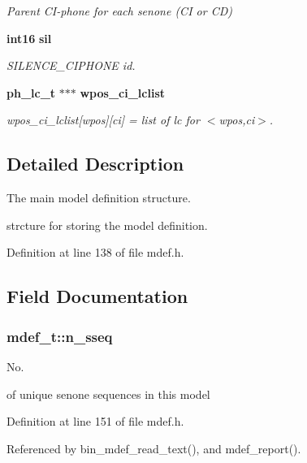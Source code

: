 \begin{DoxyCompactItemize}
\begin{DoxyCompactList}\small\item\em \-Parent \-C\-I-\/phone for each senone (\-C\-I or \-C\-D) \end{DoxyCompactList}\item 
{\bf int16} {\bf sil}\label{structmdef__t_acc9a57b57bbecaef55cc72be57b875f6}

\begin{DoxyCompactList}\small\item\em \-S\-I\-L\-E\-N\-C\-E\-\_\-\-C\-I\-P\-H\-O\-N\-E id. \end{DoxyCompactList}\item 
{\bf ph\-\_\-lc\-\_\-t} $\ast$$\ast$$\ast$ {\bf wpos\-\_\-ci\-\_\-lclist}
\begin{DoxyCompactList}\small\item\em wpos\-\_\-ci\-\_\-lclist[wpos][ci] = list of lc for $<$wpos,ci$>$. \end{DoxyCompactList}\end{DoxyCompactItemize}


\subsection{\-Detailed \-Description}
\-The main model definition structure. 

strcture for storing the model definition. 

\-Definition at line 138 of file mdef.\-h.



\subsection{\-Field \-Documentation}
\subsubsection[{n\-\_\-sseq}]{ {\bf mdef\-\_\-t\-::n\-\_\-sseq}}\label{structmdef__t_ad9afd537734fe1f336e20218da28fb2c}


\-No. 

of unique senone sequences in this model 

\-Definition at line 151 of file mdef.\-h.



\-Referenced by bin\-\_\-mdef\-\_\-read\-\_\-text(), and mdef\-\_\-report().


